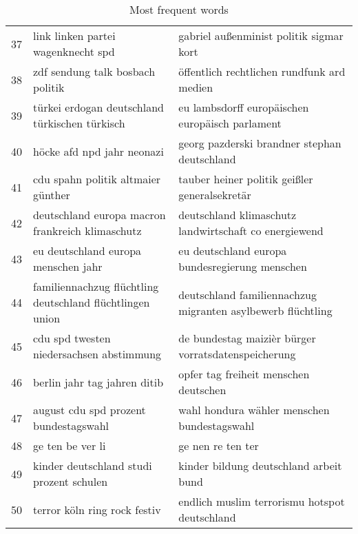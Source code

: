 \begin{table}[ht]
\begin{tabular}{lll}
  37 & link linken partei wagenknecht spd & gabriel außenminist politik sigmar kort \\ 
  38 & zdf sendung talk bosbach politik & öffentlich rechtlichen rundfunk ard medien \\ 
  39 & türkei erdogan deutschland türkischen türkisch & eu lambsdorff europäischen europäisch parlament \\ 
  40 & höcke afd npd jahr neonazi & georg pazderski brandner stephan deutschland \\ 
  41 & cdu spahn politik altmaier günther & tauber heiner politik geißler generalsekretär \\ 
  42 & deutschland europa macron frankreich klimaschutz & deutschland klimaschutz landwirtschaft co energiewend \\ 
  43 & eu deutschland europa menschen jahr & eu deutschland europa bundesregierung menschen \\ 
  44 & familiennachzug flüchtling deutschland flüchtlingen union & deutschland familiennachzug migranten asylbewerb flüchtling \\ 
  45 & cdu spd twesten niedersachsen abstimmung & de bundestag maizièr bürger vorratsdatenspeicherung \\ 
  46 & berlin jahr tag jahren ditib & opfer tag freiheit menschen deutschen \\ 
  47 & august cdu spd prozent bundestagswahl & wahl hondura wähler menschen bundestagswahl \\ 
  48 & ge ten be ver li & ge nen re ten ter \\ 
  49 & kinder deutschland studi prozent schulen & kinder bildung deutschland arbeit bund \\ 
  50 & terror köln ring rock festiv & endlich muslim terrorismu hotspot deutschland \\ 
   \hline
\end{tabular}
\caption{Most frequent words} 
\end{table}
